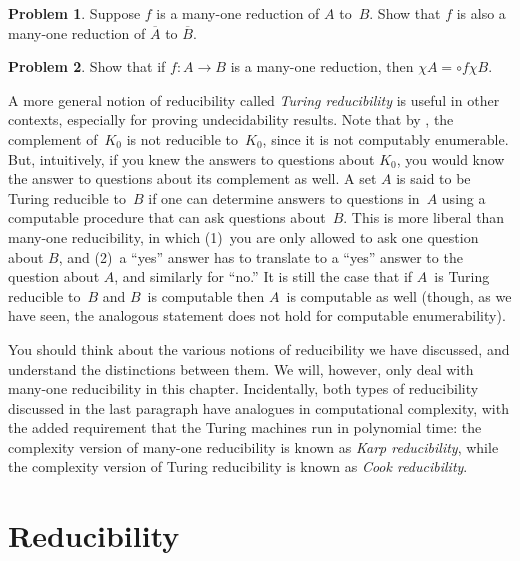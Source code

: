\documentclass[10pt,a4paper]{article}
\makeatletter
\theoremstyle{plain}
\theoremstyle{definition}
\newtheorem{prob}{Problem}[section]
\theoremstyle{remark}
\newenvironment{digress}{}{}
\newcommand*{\olfileid}[3]{}
\newcommand*{\olsection}[1]{\section*{#1}}
\newcommand{\olref}{\@ifnextchar[{\olref@i}{\olref@final}}
\def\olref@i[#1]{\@ifnextchar[{\olref@ii}{\olref@final}}
\def\olref@ii[#1]{\@ifnextchar[{\olref@iii}{\olref@final}}
\def\olref@iii[#1]{\olref@final}
\def\olref@final#1{\ref{#1}}
\providecommand{\comp}{\circ}
\providecommand{\Char}{\chi}
\providecommand{\Complement}{\overline}
\makeatother
\begin{document}
\begin{prob}
Suppose $f$ is a many-one reduction of $A$ to~$B$. Show that $f$ is
also a many-one reduction of $\Complement{A}$ to $\Complement{B}$.
\end{prob}

\begin{prob}
Show that if $f\colon A \to B$ is a many-one reduction, then $\Char{A}
= \comp{f}{\Char{B}}$.
\end{prob}

\begin{digress}
A more general notion of reducibility called \emph{Turing
reducibility} is useful in other contexts, especially for proving
undecidability results. Note that by \olref[cmp]{cor:comp-k}, the
complement of~$K_0$ is not reducible to~$K_0$, since it is not
computably enumerable. But, intuitively, if you knew the answers to
questions about $K_0$, you would know the answer to questions about
its complement as well. A set $A$ is said to be Turing reducible
to~$B$ if one can determine answers to questions in~$A$ using a
computable procedure that can ask questions about~$B$. This is more
liberal than many-one reducibility, in which (1)~you are only allowed
to ask one question about $B$, and (2)~a ``yes'' answer has to
translate to a ``yes'' answer to the question about $A$, and similarly
for ``no.'' It is still the case that if $A$~is Turing reducible
to~$B$ and $B$~is computable then $A$~is computable as well (though,
as we have seen, the analogous statement does not hold for computable
enumerability).

You should think about the various notions of reducibility we have
discussed, and understand the distinctions between them. We will,
however, only deal with many-one reducibility in this chapter.
Incidentally, both types of reducibility discussed in the last
paragraph have analogues in computational complexity, with the added
requirement that the Turing machines run in polynomial time: the
complexity version of many-one reducibility is known as \emph{Karp
reducibility}, while the complexity version of Turing reducibility is
known as \emph{Cook reducibility}.
\end{digress}





\olfileid{cmp}{thy}{red}
\olsection{Reducibility}
\end{document}
